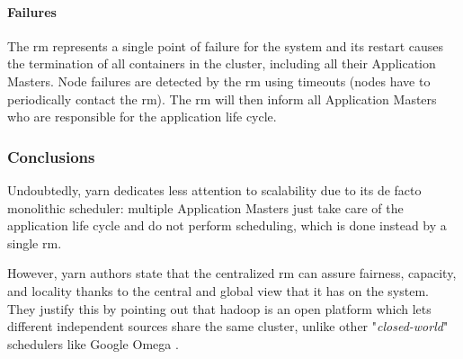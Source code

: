 \paragraph{Failures}
The \gls{rm} represents a single point of failure for the system and its restart causes the termination of all containers in the cluster, including all their Application Masters.
Node failures are detected by the \gls{rm} using timeouts (nodes have to periodically contact the \gls{rm}).
The \gls{rm} will then inform all Application Masters who are responsible for the application life cycle.

\subsubsection{Conclusions}
Undoubtedly, \glsdesc{yarn} dedicates less attention to scalability due to its de facto monolithic scheduler: multiple Application Masters just take care of the application life cycle and do not perform scheduling, which is done instead by a single \gls{rm}.\par
However, \glsdesc{yarn} authors state that the centralized \gls{rm} can assure fairness, capacity, and locality thanks to the central and global view that it has on the system.
They justify this by pointing out that \glsdesc{hadoop} is an open platform which lets different independent sources share the same cluster, unlike other "\textit{closed-world}" schedulers like Google Omega \cite{omega}.

